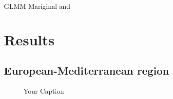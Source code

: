 \documentclass{article}
\begin{document}
GLMM Mariginal and 

\section{Results}


\subsection{European-Mediterranean region}


\begin{figure}[h]
    \centering
    
    \caption{Your Caption}
    \label{fig:your-label}
\end{figure}
\end{document}
